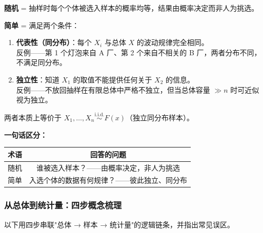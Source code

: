 \begin{remark}
\textbf{随机} = 抽样时每个个体被选入样本的概率均等，结果由概率决定而非人为挑选。

\textbf{简单} = 满足两个条件：
\begin{enumerate}[label=(\roman*)]
    \item \textbf{代表性（同分布）}：每个 $X_i$ 与总体 $X$ 的波动规律完全相同。\\
    反例——第 1 个灯泡来自 A 厂、第 2 个来自不相关的 B 厂，两者分布不同，不满足同分布。
    \item \textbf{独立性}：知道 $X_1$ 的取值不能提供任何关于 $X_2$ 的信息。\\
    反例——不放回抽样在有限总体中严格不独立，但当总体容量 $\gg n$ 时可近似视为独立。
\end{enumerate}

两者本质上等价于 $X_1,\dots,X_n \stackrel{\mathrm{i.i.d.}}{\sim} F(x)$（独立同分布样本）。

\medskip
\textbf{一句话区分：}
\begin{center}
\begin{tabular}{c|c}
\toprule
\textbf{术语} & \textbf{回答的问题} \\
\midrule
随机 & 谁被选入样本？——由概率决定，非人为挑选 \\
简单 & 入选个体的数据有何规律？——彼此独立、同分布 \\
\bottomrule
\end{tabular}
\end{center}
\end{remark}

\subsubsection{从总体到统计量：四步概念梳理}

以下用四步串联"总体 → 样本 → 统计量"的逻辑链条，并指出常见误区。

